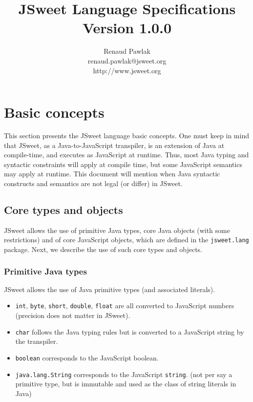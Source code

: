 \documentclass[a4paper]{report}
\begin{document}
\title{JSweet Language Specifications\\{\large Version 1.0.0}}
\author{%
Renaud Pawlak\\
{\normalsize renaud.pawlak@jsweet.org}\\
{\normalsize http://www.jsweet.org}\\
}%
\date{}
\maketitle

\tableofcontents

\chapter{Basic concepts} 

This section presents the JSweet language basic concepts. One must keep in mind that JSweet, as a Java-to-JavaScript transpiler, is an extension of Java at compile-time, and executes as JavaScript at runtime. Thus, most Java typing and syntactic constraints will apply at compile time, but some JavaScript semantics may apply at runtime. This document will mention when Java syntactic constructs and semantics are not legal (or differ) in JSweet.

\section{Core types and objects}

JSweet allows the use of primitive Java types, core Java objects (with some restrictions) and of core JavaScript objects, which are defined in the \texttt{jsweet.lang} package. Next, we describe the use of such core types and objects.

\subsection{Primitive Java types}

JSweet allows the use of Java primitive types (and associated literals).

\begin{itemize}
\item \texttt{int}, \texttt{byte}, \texttt{short}, \texttt{double}, \texttt{float} are all converted to JavaScript numbers (precision does not matter in JSweet).
\item \texttt{char} follows the Java typing rules but is converted to a JavaScript string by the transpiler.
\item \texttt{boolean} corresponds to the JavaScript boolean.
\item \texttt{java.lang.String} corresponds to the JavaScript \texttt{string}. (not per say a primitive type, but is immutable and used as the class of string literals in Java)
\end{itemize}
\end{document}

